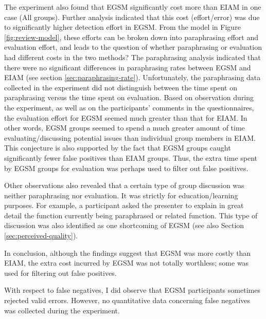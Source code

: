 
The experiment also found that EGSM significantly cost more than EIAM
in one case (All groups). 
Further analysis indicated that this cost (effort/error)
was due to significantly higher detection effort in EGSM. From the
model in Figure 
\ref{fig:review-model}, these efforts can be broken down into paraphrasing
effort and evaluation effort, and leads to the question of whether
paraphrasing or evaluation had different costs in the two methods?
The paraphrasing
analysis indicated that there were no significant differences in paraphrasing
rates between EGSM and EIAM (see section
\ref{sec:paraphrasing-rate}). Unfortunately, the paraphrasing data 
collected in the experiment did not distinguish between the time spent
on paraphrasing versus the time spent on evaluation.
Based on
observation during the experiment, as well as on the participants'
comments in the questionnaires, the evaluation effort for EGSM seemed
much greater than that for EIAM. 
In other words, EGSM groups seemed to
spend a much greater amount of time evaluating/discussing potential
issues than individual group members in EIAM.
This conjecture is also supported by the fact that EGSM groups
caught significantly fewer false positives than EIAM groups. Thus, the
extra time 
spent by EGSM groups for evaluation was  perhaps used to filter out false
positives.  

Other observations also revealed that a certain type of group discussion
was neither paraphrasing nor evaluation. It was strictly for
education/learning purposes. For example, a participant asked
the presenter to explain in great detail the function currently being
paraphrased  or related function. This type of discussion was also
identified as one shortcoming of EGSM (see also Section
\ref{sec:perceived-quality}). 

In conclusion, although the findings suggest that
EGSM was more costly than EIAM, the extra cost incurred by EGSM was
not totally worthless; some was used for filtering out false
positives. 

With respect to false negatives, I did observe that EGSM
participants sometimes rejected valid errors. However, no
quantitative data concerning false negatives was collected during the
experiment.  


